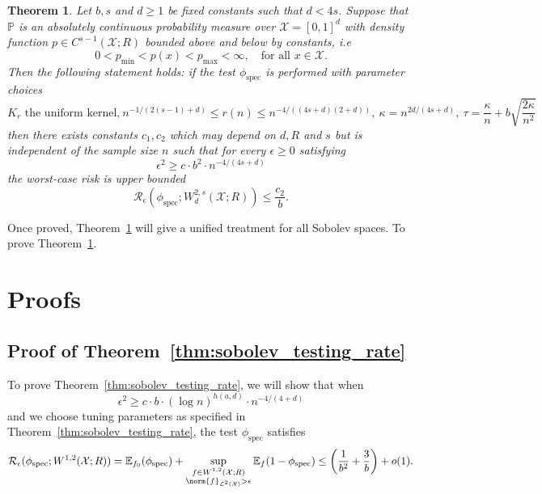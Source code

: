 \documentclass{article}
\newcommand{\1}{\mathbf{1}}
\newcommand{\Xset}{\mathcal{X}}
\newcommand{\Leb}{\mathcal{L}}
\newcommand{\Pbb}{\mathbb{P}}
\newcommand{\Ebb}{\mathbb{E}}
\newcommand{\spec}{\mathrm{spec}}
\theoremstyle{alden}
\theoremstyle{aldenthm}
\newtheorem{theorem}{Theorem}
\theoremstyle{definition}
\theoremstyle{remark}
\begin{document}
\begin{theorem}
	\label{thm:higher_order_sobolev_testing_rate}
	Let $b,s$ and $d \geq 1$ be fixed constants such that $d < 4s$. Suppose that $\Pbb$ is an absolutely continuous probability measure over $\mathcal{X} = [0,1]^d$ with density function $p \in C^{s-1}(\Xset;R)$ bounded above and below by constants, i.e
	\begin{equation*}
	0 < p_{\min} < p(x) < p_{\max} < \infty, \quad \textrm{for all $x \in \mathcal{X}$.}
	\end{equation*}
	Then the following statement holds: if the test $\phi_{\spec}$ is performed with parameter choices 
	\begin{equation*}
	\textrm{$K_r$ the uniform kernel,}~ n^{-1/(2(s-1) + d)} \leq r(n) \leq n^{-4/((4s + d)(2+d))}, ~\kappa = n^{2d/(4s + d)}, ~\tau = \frac{\kappa}{n} + b\sqrt{\frac{2\kappa}{n^2}}
	\end{equation*}
	then there exists constants $c_1,c_2$ which may depend on $d,R$ and $s$ but is independent of the sample size $n$ such that for every $\epsilon \geq 0$ satisfying
	\begin{equation}
	\label{eqn:higher_order_sobolev_testing_rate}
	\epsilon^2 \geq c \cdot b^2 \cdot n^{-4/(4s + d)}
	\end{equation}
	the worst-case risk is upper bounded
	\begin{equation}
	\label{eqn:higher_order_sobolev_testing_rate_1}
	\mathcal{R}_{\epsilon}(\phi_{\mathrm{spec}}; W_d^{2,s}(\mathcal{X};R)) \leq \frac{c_2}{b}.
	\end{equation}
\end{theorem}

Once proved, Theorem~\ref{thm:higher_order_sobolev_testing_rate} will give a unified treatment for all Sobolev spaces. To prove Theorem~\ref{thm:higher_order_sobolev_testing_rate}. 

\section{Proofs}

\subsection{Proof of Theorem~\ref{thm:sobolev_testing_rate}}

To prove Theorem~\ref{thm:sobolev_testing_rate}, we will show that when
\begin{equation}
\label{eqn:critical_radius}
\epsilon^2 \geq c \cdot b \cdot (\log n)^{h(a,d)} \cdot n^{-4/(4 + d)}
\end{equation}
and we choose tuning parameters as specified in Theorem~\ref{thm:sobolev_testing_rate}, the test $\phi_{\mathrm{spec}}$ satisfies
\begin{equation}
\mathcal{R}_{\epsilon}(\phi_{\spec}; W^{1,2}(\mathcal{X};R)) = \Ebb_{f_0}(\phi_{\spec}) + \sup_{\substack{f \in W^{1,2}(\mathcal{X};R) \\ \norm{f}_{\Leb^2(\mathcal{X})} > \epsilon}} \Ebb_{f}(1 - \phi_{\spec}) \leq \left(\frac{1}{b^2} + \frac{3}{b}\right) + o(1).
\end{equation}
\end{document}
